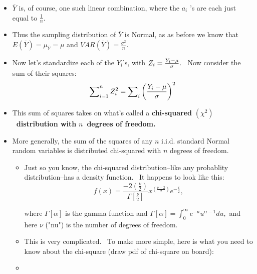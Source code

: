 \documentclass[11pt]{article}
\begin{document}
\begin{itemize}
\item $\overline{Y}$ is, of course, one such linear combination, where the $%
a_{i}$ 's are each just equal to $\frac{1}{n}.$

\item Thus the sampling distribution of $\overline{Y}$ is Normal, as as
before we know that $E\left( \overline{Y}\right) =\mu _{\overline{Y}}=\mu $
and $VAR\left( \overline{Y}\right) =\frac{\sigma ^{2}}{n}.$

\item Now let's standardize each of the $Y_{i}$'s, with $Z_{i}=\frac{%
Y_{i}-\mu }{\sigma }.$ \ Now consider the sum of their squares:%
\begin{equation*}
\sum\nolimits_{i=1}^{n}Z_{i}^{2}=\sum\nolimits_{i}\left( \frac{Y_{i}-\mu }{%
\sigma }\right) ^{2}
\end{equation*}

\item This sum of squares takes on what's called a \textbf{chi-squared }$%
\left( \chi ^{2}\right) $\textbf{\ distribution with }$n$\textbf{\ degrees
of freedom.}

\item More generally, the sum of the squares of any $n$ i.i.d. standard
Normal random variables is distributed chi-squared with $n$ degrees of
freedom.

\begin{itemize}
\item Just so you know, the chi-squared distribution--like any probablity
distribution--has a density function. \ It happens to look like this:%
\begin{equation*}
f(x)=\frac{-2\left( \frac{\nu }{2}\right) }{\Gamma \left[ \frac{\nu }{2}%
\right] }x^{(\frac{\nu -2}{2})}e^{-\frac{x}{2}},
\end{equation*}

where $\Gamma \left[ \alpha \right] $ is the gamma function and $\Gamma %
\left[ \alpha \right] =\int\nolimits_{0}^{\infty }e^{-u}u^{\alpha -1}du,$
and here $\nu $ ("nu") is the number of degrees of freedom.

\item This is very complicated. \ To make more simple, here is what you need
to know about the chi-square (draw pdf of chi-square on board):

\item {}


\end{itemize}
\end{itemize}
\end{document}
